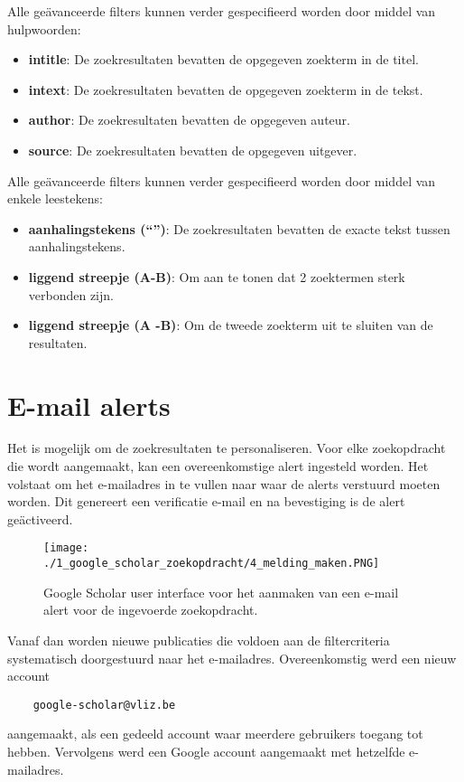 Alle geävanceerde filters kunnen verder gespecifieerd worden door middel van hulpwoorden:
\begin{itemize}
    \item \textbf{intitle}: De zoekresultaten bevatten de opgegeven zoekterm in de titel.
    \item \textbf{intext}: De zoekresultaten bevatten de opgegeven zoekterm in de tekst.
    \item \textbf{author}: De zoekresultaten bevatten de opgegeven auteur.
    \item \textbf{source}: De zoekresultaten bevatten de opgegeven uitgever.
\end{itemize}

Alle geävanceerde filters kunnen verder gespecifieerd worden door middel van enkele leestekens:
\begin{itemize}
    \item \textbf{aanhalingstekens (``'')}: De zoekresultaten bevatten de exacte tekst tussen aanhalingstekens.
    \item \textbf{liggend streepje (A-B)}: Om aan te tonen dat 2 zoektermen sterk verbonden zijn.
    \item \textbf{liggend streepje (A -B)}: Om de tweede zoekterm uit te sluiten van de resultaten.
\end{itemize}

\section{E-mail alerts}
Het is mogelijk om de zoekresultaten te personaliseren. Voor elke zoekopdracht die wordt aangemaakt, kan een overeenkomstige alert ingesteld worden.
Het volstaat om het e-mailadres in te vullen naar waar de alerts verstuurd moeten worden. Dit genereert een verificatie e-mail en na bevestiging is de alert geäctiveerd.

\begin{figure}
    \centering
    \texttt{[image: ./1\_google\_scholar\_zoekopdracht/4\_melding\_maken.PNG]}
    \caption[Google Scholar melding maken.]{\label{fig:Google Scholar melding maken}Google Scholar user interface voor het aanmaken van een e-mail alert voor de ingevoerde zoekopdracht.}
\end{figure}

Vanaf dan worden nieuwe publicaties die voldoen aan de filtercriteria systematisch doorgestuurd naar het e-mailadres.
Overeenkomstig werd een nieuw account \begin{verbatim}
    google-scholar@vliz.be
\end{verbatim} aangemaakt, als een gedeeld account waar meerdere gebruikers toegang tot hebben. Vervolgens werd een Google account aangemaakt met hetzelfde e-mailadres.
